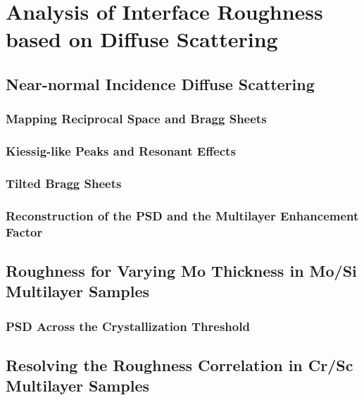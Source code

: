 \chapter{Analysis of Interface Roughness based on Diffuse Scattering} \label{ch_diff}



\section{Near-normal Incidence Diffuse Scattering}

\subsection{Mapping Reciprocal Space and Bragg Sheets}

\subsection{Kiessig-like Peaks and Resonant Effects}

\subsection{Tilted Bragg Sheets}

\subsection{Reconstruction of the PSD and the Multilayer Enhancement Factor}


\section{Roughness for Varying Mo Thickness in Mo/Si Multilayer Samples}

\subsection{PSD Across the Crystallization Threshold}


\section{Resolving the Roughness Correlation in Cr/Sc Multilayer Samples}

